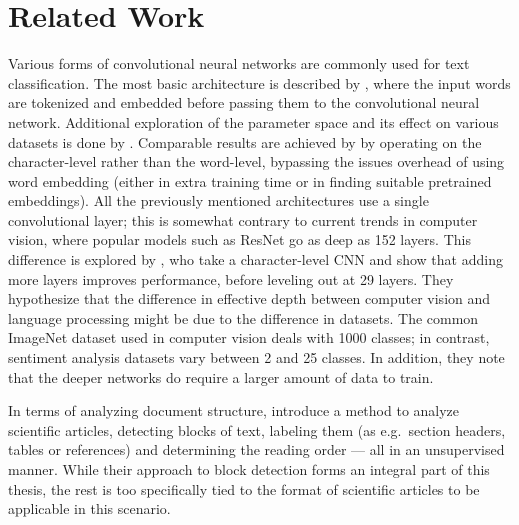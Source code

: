 \section{Related Work}

Various forms of convolutional neural networks are commonly used for text
classification. The most basic architecture is described by
\textcite{kim2014conv}, where the input words are tokenized and embedded before
passing them to the convolutional neural network. Additional exploration of the
parameter space and its effect on various datasets is done by
\textcite{zhang2015conv}. Comparable results are achieved by
\textcite{zhang2015character} by operating on the character-level rather than
the word-level, bypassing the issues overhead of using word embedding (either in
extra training time or in finding suitable pretrained embeddings). All the
previously mentioned architectures use a single convolutional layer; this is
somewhat contrary to current trends in computer vision, where popular models
such as ResNet\citep{resnet2015} go as deep as 152 layers. This difference is
explored by \textcite{Conneau2016ldeep}, who take a character-level CNN and show
that adding more layers improves performance, before leveling out at 29 layers.
They hypothesize that the difference in effective depth between computer vision
and language processing might be due to the difference in datasets. The common
ImageNet dataset used in computer vision deals with 1000 classes; in contrast,
sentiment analysis datasets vary between 2 and 25 classes. In addition, they
note that the deeper networks do require a larger amount of data to train.

In terms of analyzing document structure, \textcite{klampfl2014unsupervised}
introduce a method to analyze scientific articles, detecting blocks of text,
labeling them (as e.g.\ section headers, tables or references) and determining
the reading order --- all in an unsupervised manner. While their approach to
block detection forms an integral part of this thesis, the rest is too
specifically tied to the format of scientific articles to be applicable in this
scenario.

